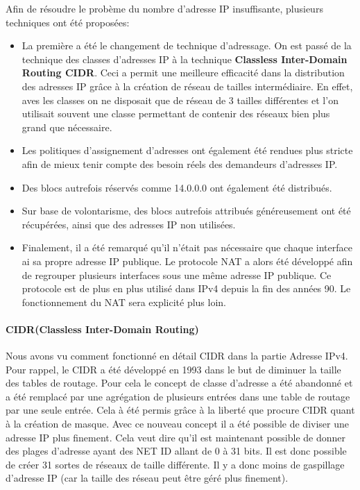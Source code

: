 Afin de résoudre le probème du nombre d'adresse IP insuffisante, plusieurs
techniques ont été proposées:
\begin{itemize}
\item La première a été le changement de technique d'adressage. On est passé de
la technique des classes d'adresses IP à la technique \textbf{Classless
Inter-Domain Routing CIDR}. Ceci a permit une meilleure efficacité dans la
distribution des adresses IP grâce à la création de réseau de tailles
intermédiaire. En effet, aves les classes on ne disposait que de réseau de 3
tailles différentes et l'on utilisait souvent une classe permettant de contenir
des réseaux bien plus grand que nécessaire.

\item Les politiques d'assignement d'adresses ont également été rendues plus
stricte afin de mieux tenir compte des besoin réels des demandeurs d'adresses
IP.

\item Des blocs autrefois réservés comme 14.0.0.0 ont également été distribués.

\item Sur base de volontarisme, des blocs autrefois attribués généreusement ont
été récupérées, ainsi que des adresses IP non utilisées.

\item Finalement, il a été remarqué qu'il n'était pas nécessaire que chaque
interface ai sa propre adresse IP publique. Le protocole NAT a alors été
développé afin de regrouper plusieurs interfaces sous une même adresse IP
publique. Ce protocole est de plus en plus utilisé dans IPv4 depuis la fin des
années 90. Le fonctionnement du NAT sera explicité plus loin.
\end{itemize}


\paragraph{CIDR(Classless Inter-Domain Routing)}
Nous avons vu comment fonctionné en détail CIDR dans la partie Adresse IPv4.
Pour rappel, le CIDR a été développé en 1993 dans le but de diminuer la taille
des tables de routage. Pour cela le concept de classe d'adresse a été abandonné
et a été remplacé par une agrégation de plusieurs entrées dans une table de
routage par une seule entrée.  Cela à été permis grâce à la liberté que procure
CIDR quant à la création de masque.  Avec ce nouveau concept il a été possible
de diviser une adresse IP plus finement. Cela veut dire qu'il est maintenant
possible de donner des plages d'adresse ayant des NET ID allant de 0 à 31 bits.
Il est donc possible de créer 31 sortes de réseaux de taille différente. Il y a
donc moins de gaspillage d'adresse IP (car la taille des réseau peut être géré
plus finement).


